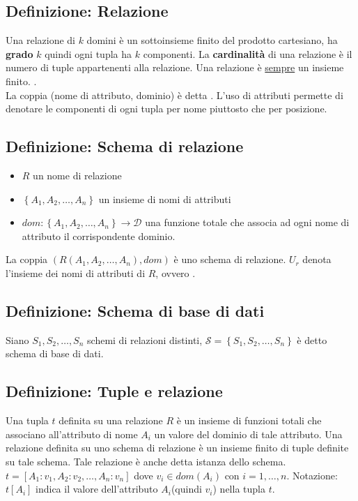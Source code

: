 \documentclass[12pt, a4paper]{report}
\begin{document}
            \subsection{Definizione: Relazione}
                Una relazione di $k$ domini è un sottoinsieme finito del prodotto cartesiano, ha \textbf{grado} $k$ quindi ogni tupla ha $k$ componenti. La \textbf{cardinalità} di una relazione è il numero di tuple appartenenti alla relazione. Una relazione è \underline{sempre} un insieme finito. .\\
            La coppia (nome di attributo, dominio) è detta . L'uso di attributi permette di denotare le componenti di ogni tupla per nome piuttosto che per posizione.
            \subsection{Definizione: Schema di relazione}
                \begin{itemize}
                    \item $R$ un nome di relazione
                    \item $\left\{A_{1},A_{2},\ldots,A_{n}\right\}$ un insieme di nomi di attributi
                    \item $dom:\left\{A_{1},A_{2},\ldots,A_{n}\right\}\rightarrow \mathcal{D}$ una funzione totale che associa ad ogni nome di attributo il corrispondente dominio.
                \end{itemize}
                La coppia $(R(A_{1},A_{2},\ldots,A_{n}),dom)$ è uno schema di relazione. $U_{r}$ denota l'insieme dei nomi di attributi di $R$, ovvero .
            \subsection{Definizione: Schema di base di dati}
                Siano $S_{1},S_{2},\ldots,S_{n}$ schemi di relazioni distinti, $\mathcal{S}=\left\{S_{1},S_{2},\ldots,S_{n}\right\}$ è detto schema di base di dati.
            \subsection{Definizione: Tuple e relazione}
                Una tupla $t$ definita su una relazione $R$ è un insieme di funzioni totali che associano all'attributo di nome $A_{i}$ un valore del dominio di tale attributo. Una relazione definita su uno schema di relazione è un insieme finito di tuple definite su tale schema. Tale relazione è anche detta istanza dello schema. $t=\left[A_{1}:v_{1},A_{2}:v_{2},\ldots,A_{n}:v_{n}\right]$ dove $v_{i}\in dom(A_{i}) \text{ con } i=1,\ldots,n$. Notazione: $t[A_{i}]$ indica il valore dell'attributo $A_{i}$(quindi $v_{i}$) nella tupla $t$.
\end{document}
